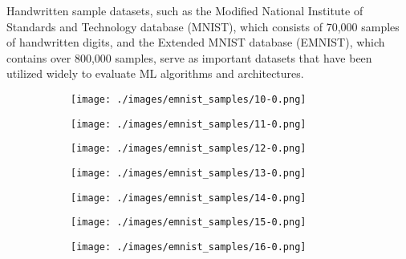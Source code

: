Handwritten sample datasets, such as the Modified National Institute of
Standards and Technology database (MNIST)\cite{mnist, deng2012mnist}, which
consists of 70,000 samples of handwritten digits, and the Extended MNIST
database\cite{cohen2017emnist} (EMNIST), which contains over 800,000 samples,
serve as important datasets that have been utilized widely to evaluate ML
algorithms and architectures.

\begin{figure}[H]
    \centering
    \begin{subfigure}{.10\textwidth}
        \centering
        \texttt{[image: ./images/emnist\_samples/10-0.png]}
    \end{subfigure}%
    \begin{subfigure}{.10\textwidth}
        \centering
        \texttt{[image: ./images/emnist\_samples/11-0.png]}
    \end{subfigure}%
    \begin{subfigure}{.10\textwidth}
        \centering
        \texttt{[image: ./images/emnist\_samples/12-0.png]}
    \end{subfigure}%
    \begin{subfigure}{.10\textwidth}
        \centering
        \texttt{[image: ./images/emnist\_samples/13-0.png]}
    \end{subfigure}%
    \begin{subfigure}{.10\textwidth}
        \centering
        \texttt{[image: ./images/emnist\_samples/14-0.png]}
    \end{subfigure}%
    \begin{subfigure}{.10\textwidth}
        \centering
        \texttt{[image: ./images/emnist\_samples/15-0.png]}
    \end{subfigure}%
    \begin{subfigure}{.10\textwidth}
        \centering
        \texttt{[image: ./images/emnist\_samples/16-0.png]}

\end{subfigure}
\end{figure}
